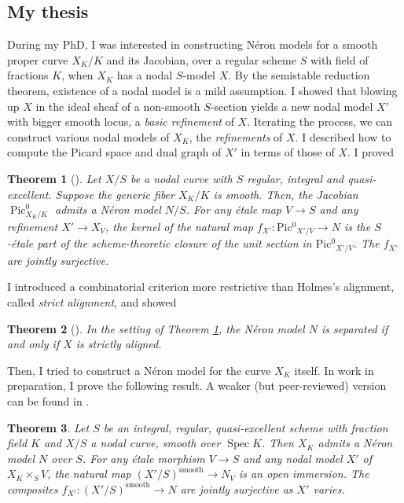 \documentclass[12pt]{extarticle}
\DeclareMathOperator{\Spec}{Spec}
\newtheorem{theorem}{Theorem}
\begin{document}
\subsection*{My thesis}

During my PhD, I was interested in constructing N\'eron models for a smooth proper curve $X_K/K$ and its Jacobian, over a regular scheme $S$ with field of fractions $K$, when $X_K$ has a nodal $S$-model $X$. By the semistable reduction theorem, existence of a nodal model is a mild assumption. I showed that blowing up $X$ in the ideal sheaf of a non-smooth $S$-section yields a new nodal model $X'$ with bigger smooth locus, a \emph{basic refinement} of $X$. Iterating the process, we can construct various nodal models of $X_K$, the \emph{refinements} of $X$. I described how to compute the Picard space and dual graph of $X'$ in terms of those of $X$. I proved

\begin{theorem}[{\cite[Theorem 7.6]{Poiret}}]\label{thm1}
	Let $X/S$ be a nodal curve with $S$ regular, integral and quasi-excellent. Suppose the generic fiber $X_K/K$ is smooth. Then, the Jacobian $\operatorname{Pic}^0_{X_K/K}$ admits a N\'eron model $N/S$. For any \'etale map $V \to S$ and any refinement $X' \to X_V$, the kernel of the natural map $f_{X'}\colon\operatorname{Pic^0}_{X'/V} \to N$ is the $S$-\'etale part of the scheme-theoretic closure of the unit section in $\operatorname{Pic^0}_{X'/V}$. The $f_{X'}$ are jointly surjective.
\end{theorem}

I introduced a combinatorial criterion more restrictive than Holmes's alignment, called \emph{strict alignment}, and showed

\begin{theorem}[{\cite[Theorem 7.13]{Poiret}}]
	In the setting of Theorem \ref{thm1}, the N\'eron model $N$ is separated if and only if $X$ is strictly aligned.
\end{theorem}

Then, I tried to construct a N\'eron model for the curve $X_K$ itself. In work in preparation, I prove the following result. A weaker (but peer-reviewed) version can be found in \cite[Theorem 7.40]{PoiretThesis}.

\begin{theorem}\label{thm3}
	Let $S$ be an integral, regular, quasi-excellent scheme with fraction field $K$ and $X/S$ a nodal curve, smooth over $\Spec K$. Then $X_K$ admits a N\'eron model $N$ over $S$. For any \'etale morphism $V \to S$ and any nodal model $X'$ of $X_K\times_S V$, the natural map $(X'/S)^{\operatorname{smooth}} \to N_V$ is an open immersion. The composites $f_{X'}\colon (X'/S)^{\operatorname{smooth}} \to N$ are jointly surjective as $X'$ varies.
\end{theorem}
\end{document}
